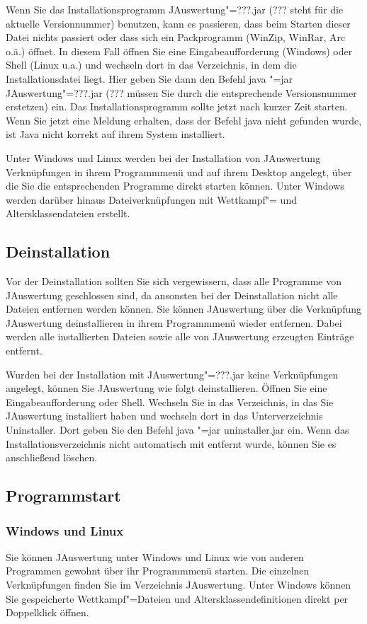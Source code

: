 \documentclass[11pt,a4paper,twoside,ngerman]{article}
\begin{document}
Wenn Sie das Installationsprogramm JAuswertung"=???.jar (??? steht für die aktuelle Versionnummer) benutzen, kann es passieren, dass  beim Starten dieser Datei nichts passiert oder dass sich ein Packprogramm (WinZip, WinRar, Arc o.ä.) öffnet. In diesem Fall öffnen Sie eine Eingabeaufforderung (Windows) oder Shell (Linux u.a.) und wechseln dort in das Verzeichnis, in dem die Installationsdatei liegt. Hier geben Sie dann den Befehl \glqq{}java "=jar JAuswertung"=???.jar\grqq{} (??? müssen Sie durch die entsprechende Versionsnummer erstetzen) ein. Das Installationsprogramm sollte jetzt nach kurzer Zeit starten. Wenn Sie jetzt eine Meldung erhalten, dass der Befehl java nicht gefunden wurde, ist Java nicht korrekt auf ihrem System installiert.

Unter Windows und Linux werden bei der Installation von JAuswertung Verknüpfungen in ihrem Programmmenü und auf ihrem Desktop angelegt, über die Sie die entsprechenden Programme direkt starten können. Unter Windows werden darüber hinaus Dateiverknüpfungen mit Wettkampf"= und Altersklassendateien erstellt.


\subsection*{Deinstallation}
Vor der Deinstallation sollten Sie sich vergewissern, dass alle Programme von JAuswertung geschlossen sind, da ansonsten bei der Deinstallation nicht alle Dateien entfernen werden können. Sie können JAuswertung über die Verknüpfung \glqq{}JAuswertung deinstallieren\grqq{} in ihrem Programmmenü wieder entfernen. Dabei werden alle installierten Dateien sowie alle von JAuswertung erzeugten Einträge entfernt.

Wurden bei der Installation mit \glqq{}JAuswertung"=???.jar\grqq{} keine Verknüpfungen angelegt, können Sie JAuswertung wie folgt deinstallieren. Öffnen Sie eine Eingabeaufforderung oder Shell. Wechseln Sie in das Verzeichnis, in das Sie JAuswertung installiert haben und wechseln dort in das Unterverzeichnis \glqq{}Uninstaller\grqq{}. Dort geben Sie den Befehl \glqq{}java "=jar uninstaller.jar\grqq{} ein. Wenn das Installationsverzeichnis nicht automatisch mit entfernt wurde, können Sie es anschließend löschen.


\subsection*{Programmstart}

\subsubsection*{Windows und Linux}
Sie können JAuswertung unter Windows und Linux wie von anderen Programmen gewohnt über ihr Programmmenü starten. Die einzelnen Verknüpfungen finden Sie im Verzeichnis JAuswertung. Unter Windows können Sie gespeicherte Wettkampf"=Dateien und Altersklassendefinitionen direkt per Doppelklick öffnen.
\end{document}

